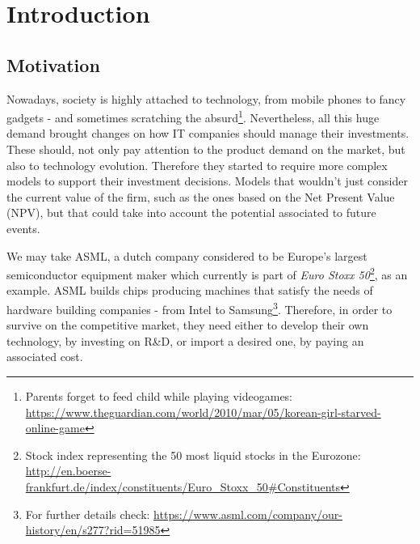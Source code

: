 
\chapter{Introduction}
\label{chapter:introduction}


\section{Motivation}
\label{section:motivation}

Nowadays, society is highly attached to technology, from mobile phones to fancy gadgets - and sometimes scratching the absurd\footnote{Parents forget to feed child while playing videogames:\\
\url{https://www.theguardian.com/world/2010/mar/05/korean-girl-starved-online-game} }.
 Nevertheless, all this huge demand brought changes on how IT companies should manage their investments. These should, not only pay attention to the product demand on the market, but also to technology evolution. Therefore they started to require more complex models to support their investment decisions. Models that wouldn't just consider the current value of the firm, such as the ones based on the Net Present Value (NPV), but that could take into account the potential associated to future events.

We may take ASML, a dutch company considered to be Europe's largest semiconductor equipment maker which currently is part of \textit{Euro Stoxx 50}\footnote{Stock index representing the 50 most liquid stocks in the Eurozone:\\  \url{http://en.boerse-frankfurt.de/index/constituents/Euro_Stoxx_50\#Constituents} }, as an example.
ASML builds chips producing machines that satisfy the needs of hardware building companies - from Intel to Samsung\footnote{For further details check: \url{https://www.asml.com/company/our-history/en/s277?rid=51985}}.
Therefore, in order to survive on the competitive market, they need either to develop their own technology, by investing on R\&D, or import a desired one, by paying an associated cost.

